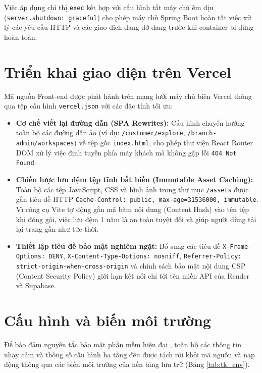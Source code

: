 Việc áp dụng chỉ thị \texttt{exec} kết hợp với cấu hình tắt máy chủ êm dịu (\texttt{server.shutdown: graceful}) cho phép máy chủ Spring Boot hoàn tất việc xử lý các yêu cầu HTTP và các giao dịch đang dở dang trước khi container bị dừng hoàn toàn.

\section{Triển khai giao diện trên Vercel}
\label{sec:tk_vercel}

Mã nguồn Front-end được phát hành trên mạng lưới máy chủ biên Vercel thông qua tệp cấu hình \texttt{vercel.json} với các đặc tính tối ưu:
\begin{itemize}
    \item \textbf{Cơ chế viết lại đường dẫn (SPA Rewrites):} Cấu hình chuyển hướng toàn bộ các đường dẫn ảo (ví dụ: \texttt{/customer/explore}, \texttt{/branch-admin/workspaces}) về tệp gốc \texttt{index.html}, cho phép thư viện React Router DOM xử lý việc định tuyến phía máy khách mà không gặp lỗi \texttt{404 Not Found}.
    \item \textbf{Chiến lược lưu đệm tệp tĩnh bất biến (Immutable Asset Caching):} Toàn bộ các tệp JavaScript, CSS và hình ảnh trong thư mục \texttt{/assets} được gắn tiêu đề HTTP \texttt{Cache-Control: public, max-age=31536000, immutable}. Vì công cụ Vite tự động gắn mã băm nội dung (Content Hash) vào tên tệp khi đóng gói, việc lưu đệm 1 năm là an toàn tuyệt đối và giúp người dùng tải lại trang gần như tức thời.
    \item \textbf{Thiết lập tiêu đề bảo mật nghiêm ngặt:} Bổ sung các tiêu đề \texttt{X-Frame-Options: DENY}, \texttt{X-Content-Type-Options: nosniff}, \texttt{Referrer-Policy: strict-origin-when-cross-origin} và chính sách bảo mật nội dung CSP (Content Security Policy) giới hạn kết nối chỉ tới tên miền API của Render và Supabase.
\end{itemize}

\section{Cấu hình và biến môi trường}
\label{sec:tk_env}

Để bảo đảm nguyên tắc bảo mật phần mềm hiện đại \cite{owasp_top10}, toàn bộ các thông tin nhạy cảm và thông số cấu hình hạ tầng đều được tách rời khỏi mã nguồn và nạp động thông qua các biến môi trường của nền tảng lưu trữ (Bảng \ref{tab:tk_env}).


